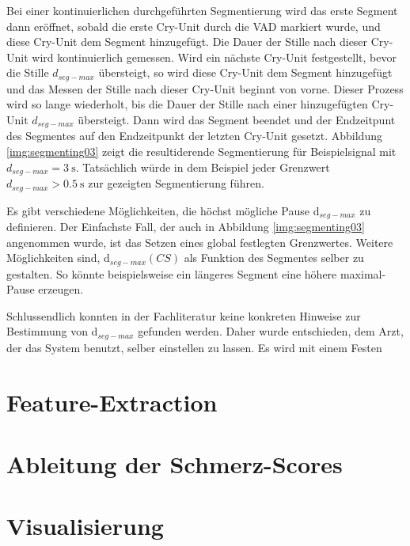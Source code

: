 Bei einer kontinuierlichen durchgeführten Segmentierung wird das erste Segment dann eröffnet, sobald die erste Cry-Unit durch die VAD markiert wurde, und diese Cry-Unit dem Segment hinzugefügt. Die Dauer der Stille nach dieser Cry-Unit wird kontinuierlich gemessen. Wird ein nächste Cry-Unit festgestellt, bevor die Stille $d_{seg-max}$ übersteigt, so wird diese Cry-Unit dem Segment hinzugefügt und das Messen der Stille nach dieser Cry-Unit beginnt von vorne. Dieser Prozess wird so lange wiederholt, bis die Dauer der Stille nach einer hinzugefügten Cry-Unit $d_{seg-max}$ übersteigt. Dann wird das Segment beendet und der Endzeitpunt des Segmentes auf den Endzeitpunkt der letzten Cry-Unit gesetzt. Abbildung \ref{img:segmenting03} zeigt die resultiderende Segmentierung für Beispielsignal mit $d_{seg-max}  = \SI{3}{\second}$. Tatsächlich würde in dem Beispiel jeder Grenzwert $d_{seg-max} >\SI{0.5}{\second}$ zur gezeigten Segmentierung führen.

Es gibt verschiedene Möglichkeiten, die höchst mögliche Pause d$_{seg-max}$ zu definieren. Der Einfachste Fall, der auch in Abbildung \ref{img:segmenting03} angenommen wurde, ist das Setzen eines global festlegten Grenzwertes. Weitere Möglichkeiten sind, d$_{seg-max}(CS)$ als Funktion des Segmentes selber zu gestalten. So könnte beispielsweise ein längeres Segment eine höhere maximal-Pause erzeugen. 

Schlussendlich konnten in der Fachliteratur keine konkreten Hinweise zur Bestimmung von d$_{seg-max}$ gefunden werden. Daher wurde entschieden, dem Arzt, der das System benutzt, selber einstellen zu lassen. Es wird mit einem Festen 

\section{Feature-Extraction}
\label{sec:segmentFeatures}

\section{Ableitung der Schmerz-Scores}
\label{sec:regressionPainScore}

\section{Visualisierung}
\label{sec:visualisation}
